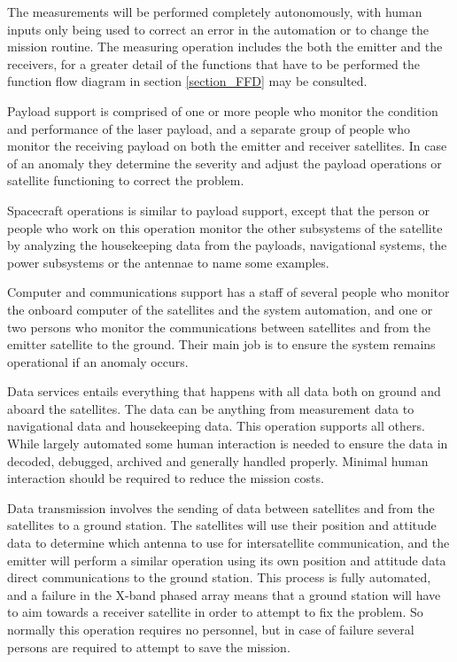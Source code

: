\documentclass[11pt]{report}
\begin{document}
The measurements will be performed completely autonomously, with human inputs only being used to correct an error in the automation or to change the mission routine. The measuring operation includes the both the emitter and the receivers, for a greater detail of the functions that have to be performed the function flow diagram in section \ref{section_FFD} may be consulted.

Payload support is comprised of one or more people who monitor the condition and performance of the laser payload, and a separate group of people who monitor the receiving payload on both the emitter and receiver satellites. In case of an anomaly they determine the severity and adjust the payload operations or satellite functioning to correct the problem.

Spacecraft operations is similar to payload support, except that the person or people who work on this operation monitor the other subsystems of the satellite by analyzing the housekeeping data from the payloads, navigational systems, the power subsystems or the antennae to name some examples.

Computer and communications support has a staff of several people who monitor the onboard computer of the satellites and the system automation, and one or two persons who monitor the communications between satellites and from the emitter satellite to the ground. Their main job is to ensure the system remains operational if an anomaly occurs.

Data services entails everything that happens with all data both on ground and aboard the satellites. The data can be anything from measurement data to navigational data and housekeeping data. This operation supports all others. While largely automated some human interaction is needed to ensure the data in decoded, debugged, archived and generally handled properly. Minimal human interaction should be required to reduce the mission costs.

Data transmission involves the sending of data between satellites and from the satellites to a ground station. The satellites will use their position and attitude data to determine which antenna to use for intersatellite communication, and the emitter will perform a similar operation using its own position and attitude data direct communications to the ground station. This process is fully automated, and a failure in the X-band phased array means that a ground station will have to aim towards a receiver satellite in order to attempt to fix the problem. So normally this operation requires no personnel, but in case of failure several persons are required to attempt to save the mission.
\end{document}
